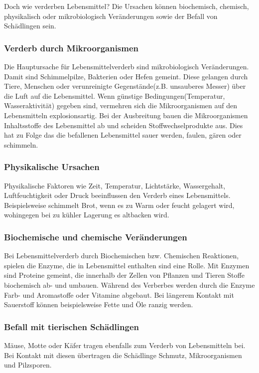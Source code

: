  Doch wie verderben Lebensmittel? Die Ursachen können biochemisch, chemisch, physikalisch oder mikrobiologisch Veränderungen sowie der Befall von Schädlingen sein. %
\subsubsection{Verderb durch Mikroorganismen}
Die Hauptursache für Lebensmittelverderb sind mikrobiologisch Veränderungen. Damit sind Schimmelpilze, Bakterien oder Hefen gemeint. Diese gelangen durch Tiere, Menschen oder verunreinigte Gegenstände(z.B. unsauberes Messer) über die Luft auf die Lebensmittel. Wenn günstige Bedingungen(Temperatur, Wasseraktivität) gegeben sind, vermehren sich die Mikroorganismen auf den Lebensmitteln explosionsartig. Bei der Ausbreitung bauen die Mikroorganismen Inhaltsstoffe des Lebensmittel ab und scheiden Stoffwechselprodukte aus. Dies hat zu Folge das die befallenen Lebensmittel sauer werden, faulen, gären oder schimmeln.  %

\subsubsection{Physikalische Ursachen}
Physikalische Faktoren wie Zeit, Temperatur, Lichtstärke, Wassergehalt, Luftfeuchtigkeit oder Druck beeinflussen den Verderb eines Lebensmittels. Beispielsweise schimmelt Brot, wenn es zu Warm oder feucht gelagert wird, wohingegen bei zu kühler Lagerung es altbacken wird. %

\subsubsection{Biochemische und chemische Veränderungen}
Bei Lebensmittelverderb durch Biochemischen bzw. Chemischen Reaktionen, spielen die Enzyme, die in Lebensmittel enthalten sind eine Rolle. Mit Enzymen sind Proteine gemeint, die innerhalb der Zellen von Pflanzen und Tieren Stoffe biochemisch ab- und umbauen. Während des Verberbes werden durch die Enzyme Farb- und Aromastoffe oder Vitamine abgebaut. Bei längerem Kontakt mit Sauerstoff können beispielsweise Fette und Öle ranzig werden. %
\subsubsection{Befall mit tierischen Schädlingen}
Mäuse, Motte oder Käfer tragen ebenfalls zum Verderb von Lebensmitteln bei. Bei Kontakt mit diesen übertragen die Schädlinge Schmutz, Mikroorganismen und Pilzsporen. %


